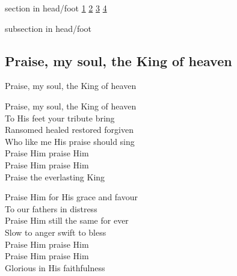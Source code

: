 \documentclass{beamer}
\begin{document}
{
{ 
 {
 \begin{beamercolorbox}[ht=4.5ex,dp=1.5ex,%
      leftskip=.3cm,rightskip=.3cm plus1fil]{section in head/foot}
 \fontsize{12}{25}\selectfont 
\hyperlink{Praise, my soul, the King of heaven[]1}{1}
\hyperlink{Praise, my soul, the King of heaven[]2}{2}
\hyperlink{Praise, my soul, the King of heaven[]3}{3}
\hyperlink{Praise, my soul, the King of heaven[]4}{4}
 
 \end{beamercolorbox}%
  \begin{beamercolorbox}[ht=2.5ex,dp=1.125ex,%
   leftskip=.3cm,rightskip=.3cm plus1fil]{subsection in head/foot}
   \insertauthor
 \end{beamercolorbox}%
 }
}
\subsection{ Praise, my soul, the King of heaven }

\hypertarget{Praise, my soul, the King of heaven[]1}{}
\begin{frame}{Praise, my soul, the King of heaven }
\fontsize{ 20 }{ 27 }\selectfont

Praise, my soul, the King of heaven\\ 
To His feet your tribute bring\\ 
Ransomed healed restored forgiven\\ 
Who like me His praise should sing\\ 
Praise Him praise Him\\ 
Praise Him praise Him\\ 
Praise the everlasting King 

\end{frame}

\hypertarget{Praise, my soul, the King of heaven[]2}{}
\begin{frame}{}
\fontsize{ 20 }{ 27 }\selectfont

Praise Him for His grace and favour\\ 
To our fathers in distress\\ 
Praise Him still the same for ever\\ 
Slow to anger swift to bless\\ 
Praise Him praise Him\\ 
Praise Him praise Him\\ 
Glorious in His faithfulness 


\end{frame}}
\end{document}
